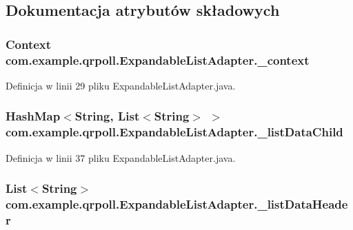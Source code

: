 \subsection{Dokumentacja atrybutów składowych}
\hypertarget{classcom_1_1example_1_1qrpoll_1_1_expandable_list_adapter_a7a712744eebf94bc189b44e5d04ff7da}{
\subsubsection[{\+\_\+context}]{\setlength{\rightskip}{0pt plus 5cm}Context com.\+example.\+qrpoll.\+Expandable\+List\+Adapter.\+\_\+context\hspace{0.3cm}{\ttfamily [private]}}}\label{classcom_1_1example_1_1qrpoll_1_1_expandable_list_adapter_a7a712744eebf94bc189b44e5d04ff7da}


Definicja w linii 29 pliku Expandable\+List\+Adapter.\+java.

\hypertarget{classcom_1_1example_1_1qrpoll_1_1_expandable_list_adapter_a9e3d05b47021b43ad465a1f7fa3d0ca2}{
\subsubsection[{\+\_\+list\+Data\+Child}]{\setlength{\rightskip}{0pt plus 5cm}Hash\+Map$<$String, List$<$String$>$ $>$ com.\+example.\+qrpoll.\+Expandable\+List\+Adapter.\+\_\+list\+Data\+Child\hspace{0.3cm}{\ttfamily [private]}}}\label{classcom_1_1example_1_1qrpoll_1_1_expandable_list_adapter_a9e3d05b47021b43ad465a1f7fa3d0ca2}


Definicja w linii 37 pliku Expandable\+List\+Adapter.\+java.

\hypertarget{classcom_1_1example_1_1qrpoll_1_1_expandable_list_adapter_a7290d1e184f1a8ef03ad8ea5bd4f273d}{
\subsubsection[{\+\_\+list\+Data\+Header}]{\setlength{\rightskip}{0pt plus 5cm}List$<$String$>$ com.\+example.\+qrpoll.\+Expandable\+List\+Adapter.\+\_\+list\+Data\+Header\hspace{0.3cm}{\ttfamily [private]}}}\label{classcom_1_1example_1_1qrpoll_1_1_expandable_list_adapter_a7290d1e184f1a8ef03ad8ea5bd4f273d}


